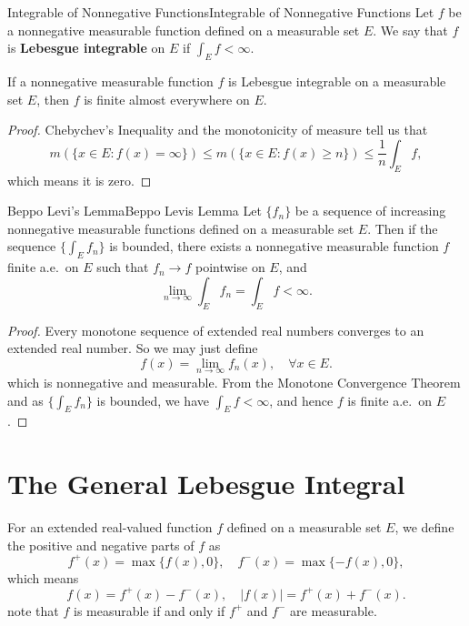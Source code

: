 \documentclass[../main.tex]{subfiles}
\begin{document}
\begin{definition}{Integrable of Nonnegative Functions}{Integrable of Nonnegative Functions}
	Let $f$ be a nonnegative measurable function defined on a measurable set $E$. We say that $f$ is \textbf{Lebesgue integrable} on $E$ if $\int_E f < \infty$.
\end{definition}

\begin{proposition}{}{}
	If a nonnegative measurable function $f$ is Lebesgue integrable on a measurable set $E$, then $f$ is finite almost everywhere on $E$.
\end{proposition}
\begin{proof}
	Chebychev's Inequality and the monotonicity of measure tell us that
	\begin{equation*}
		m(\{x \in E : f(x) = \infty\}) \leq m(\{x \in E : f(x) \geq n\}) \leq \frac{1}{n} \int_E f,
	\end{equation*}
	which means it is zero.
\end{proof}

\begin{lemma}{Beppo Levi's Lemma}{Beppo Levis Lemma}
	Let $\{ f_n \}$ be a sequence of increasing nonnegative measurable functions defined on a measurable set $E$. Then if the sequence $\{ \int_E f_n \}$ is bounded, there exists a nonnegative measurable function $f$ finite a.e.\ on $E$ such that $f_n \to f$ pointwise on $E$, and
	\begin{equation*}
		\lim_{n \to \infty} \int_E f_n = \int_E f < \infty.
	\end{equation*}
\end{lemma}
\begin{proof}
	Every monotone sequence of extended real numbers converges to an extended real number. So we may just define
	\begin{equation*}
		f(x) = \lim_{n \to \infty} f_n(x), \quad \forall x \in E.
	\end{equation*}
	which is nonnegative and measurable. From the Monotone Convergence Theorem and as $\{ \int_E f_n \}$ is bounded, we have $\int_E f < \infty$, and hence $f$ is finite a.e.\ on $E$.
\end{proof}

\section{The General Lebesgue Integral}
For an extended real-valued function $f$ defined on a measurable set $E$, we define the positive and negative parts of $f$ as
\begin{equation*}
	f^+(x) = \max\{f(x), 0\}, \quad f^-(x) = \max\{-f(x), 0\},
\end{equation*}
which means
\begin{equation*}
	f(x) = f^+(x) - f^-(x), \quad |f(x)| = f^+(x) + f^-(x).
\end{equation*}
note that $f$ is measurable if and only if $f^+$ and $f^-$ are measurable.
\end{document}
